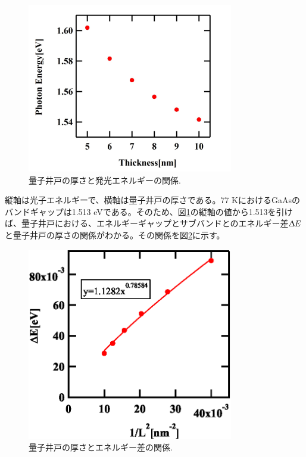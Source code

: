 \documentclass[11pt,a4j]{jsarticle}
\begin{document}
\begin{enumerate}
       \begin{figure}[ht]
        \centering
        \includegraphics[clip,width=9cm]{start2_MQW_77K_Eg.jpg}
        \caption{量子井戸の厚さと発光エネルギーの関係.}
        \label{fig_mqw_77_eg1}
       \end{figure}

       縦軸は光子エネルギーで、横軸は量子井戸の厚さである。77 KにおけるGaAsのバンドギャップは1.513 eVである。そのため、図\ref{fig_mqw_77_eg1}の縦軸の値から1.513を引けば、量子井戸における、エネルギーギャップとサブバンドとのエネルギー差$\Updelta E$と量子井戸の厚さの関係がわかる。その関係を図\ref{fig_mqw_77_welllength1}に示す。

       \newpage

       \begin{figure}[ht]
        \centering
        \includegraphics[clip,width=9cm]{start2_MQW_77K_wellLength.eps}
        \caption{量子井戸の厚さとエネルギー差の関係.}
        \label{fig_mqw_77_welllength1}
       \end{figure}


\end{enumerate}
\end{document}
